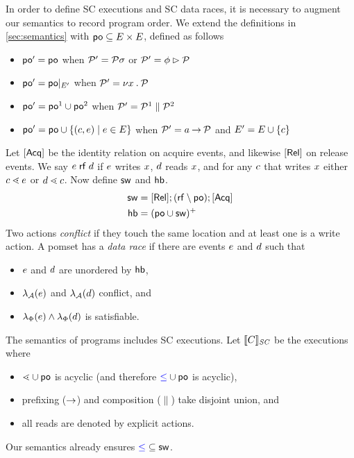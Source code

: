 In order to define SC executions and SC data races, it is necessary to
augment our semantics to record program order.  We extend the definitions in
\textsection\ref{sec:semantics} with
${\mathrel{\mathsf{po}}}\subseteq{E}\times{E}$, defined as follows
\begin{itemize}
\item
  ${\mathrel{\mathsf{po}}'} = {\mathrel{\mathsf{po}}}$
  when $\mathcal{P}'=\mathcal{P}\sigma$
  or $\mathcal{P}'=\phi\mathbin\rhd\mathcal{P}$
\item
  ${\mathrel{\mathsf{po}}'} = {\mathrel{\mathsf{po}}}\mathbin{|}_{E'}$
  when $\mathcal{P}'=\nu x\mathbin.\mathcal{P}$
\item
  ${\mathrel{\mathsf{po}}'} = {\mathrel{\mathsf{po}}}^1\cup{\ensuremath{\mathrel{\mathsf{po}}}}^2$
  when $\mathcal{P}'=\mathcal{P}^1\parallel\mathcal{P}^2$
\item
  ${\mathrel{\mathsf{po}}'} = {\mathrel{\mathsf{po}}}\cup\{(c,e)\mid e\in E\}$
  when $\mathcal{P}'=a\mathbin\rightarrow\mathcal{P}$ and $E' = E \cup \{c\}$
\end{itemize}
Let $[\mathsf{Acq}]$ be the identity relation on acquire events, and likewise $[\mathsf{Rel}]$ on release events.
We say $e\mathrel{\mathsf{rf}}d$ if $e$ writes $x$, $d$ reads $x$, and for any $c$ that writes $x$ either $c\lessdot e$ or $d\lessdot c$.
Now define $\mathrel{\mathsf{sw}}$ and $\mathrel{\mathsf{hb}}$.
\begin{align*}
  {\ensuremath{\mathrel{\mathsf{sw}}}} &= [\mathsf{Rel}]; ({\mathrel{\mathsf{rf}}}\setminus{\ensuremath{\mathrel{\mathsf{po}}}}); [\mathsf{Acq}]
  \\
  {\mathrel{\mathsf{hb}}} &= ({\mathrel{\mathsf{po}}} \cup {\ensuremath{\mathrel{\mathsf{sw}}}})^+
\end{align*}
Two actions \emph{conflict} if they touch the same location and at least one
is a write action.  A pomset has a \emph{data race} if there are events
$e$ and $d$ such that 
\begin{itemize}
\item $e$ and $d$ are unordered by $\mathrel{\mathsf{hb}}$,
\item $\lambda_{\mathcal{A}}(e)$ and $\lambda_{\mathcal{A}}(d)$ conflict, and
\item $\lambda_{\Phi}(e)\land\lambda_{\Phi}(d)$ is satisfiable.
\end{itemize}
The semantics of programs includes SC executions.  Let $\llbracket C\rrbracket_{\textit{SC}}$ be the
executions where
\begin{itemize}
\item ${\lessdot}\cup{\ensuremath{\mathrel{\mathsf{po}}}}$ is acyclic (and therefore ${\mathrel{{\color{blue}\leq}}}\cup{\ensuremath{\mathrel{\mathsf{po}}}}$ is acyclic),
\item prefixing ($\mathbin\rightarrow$) and composition ($\parallel$) take disjoint union, and
\item all reads are denoted by explicit actions.
\end{itemize}
Our semantics already ensures ${\mathrel{{\color{blue}\leq}}}\subseteq{\ensuremath{\mathrel{\mathsf{sw}}}}$.


